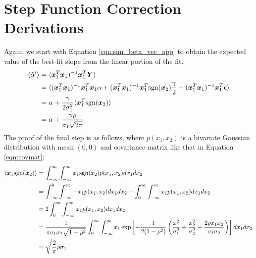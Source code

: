 \section{Step Function Correction Derivations}
\label{app:step_func}
Again, we start with Equation \ref{eqn:sim_beta_vec_app} to obtain the expected value of the best-fit slope from the linear portion of the fit.
\begin{align*}
    \langle\hat{\alpha}^\prime\rangle &= \langle \bm{x}_1^T\bm{x}_1)^{-1}\bm{x}_1^T\bm{Y}\rangle \\
    &= \langle(\bm{x}_1^T\bm{x}_1)^{-1}\bm{x}_1^T\bm{x}_1\alpha + (\bm{x}_1^T\bm{x}_1)^{-1}\bm{x}_1^T\text{sgn}(\bm{x}_2)\frac{\gamma}{2}+(\bm{x}_1^T\bm{x}_1)^{-1}\bm{x}_1^T\bm{\epsilon}\rangle\\
    &= \alpha + \frac{\gamma}{2\sigma_1^2}\langle\bm{x}_1^T\text{sgn}(\bm{x}_2)\rangle \\
    &= \alpha + \frac{\gamma\rho}{\sigma_1\sqrt{2\pi}}
\end{align*}
The proof of the final step is as follows, where $p(x_1, x_2)$ is a bivariate Gaussian distribution with mean $(0, 0)$ and covariance matrix like that in Equation \ref{eqn:covmat}:
\begin{align}
\label{eqn:exp_val_abs_val}
    \langle \bm{x}_1\text{sgn}(\bm{x}_2)\rangle &= \displaystyle\int_{-\infty}^\infty \displaystyle\int_{-\infty}^\infty x_1\text{sgn}(x_2)p(x_1, x_2)dx_1dx_2\nonumber\\
    &= \displaystyle\int_{-\infty}^0 \displaystyle\int_{-\infty}^\infty -x_1 p(x_1, x_2)dx_1dx_2+
    \displaystyle\int_{0}^\infty \displaystyle\int_{-\infty}^\infty x_1 p(x_1, x_2)dx_1dx_2\nonumber\\
    &= 2 \displaystyle\int_{0}^\infty \displaystyle\int_{-\infty}^\infty x_1 p(x_1, x_2)dx_1dx_2\nonumber\\
    &= \frac{1}{\pi\sigma_1\sigma_2\sqrt{1-\rho^2}}\displaystyle\int_{0}^\infty \displaystyle\int_{-\infty}^\infty x_1 \exp\left[-\frac{1}{2(1-\rho^2)}\left(\frac{x_1^2}{\sigma_1^2}+\frac{x_2^2}{\sigma_2^2}-\frac{2\rho x_1 x_2}{\sigma_1\sigma_2}\right)\right]dx_1dx_2\nonumber\\
    &= \sqrt\frac{2}{\pi}\rho\sigma_1
\end{align}

